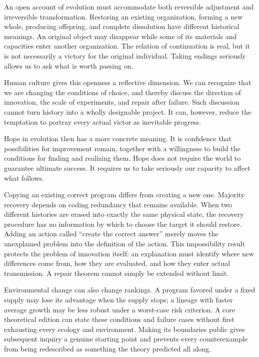 \documentclass[
  english,
  11pt,
  oneside]{book}
\begin{document}
An open account of evolution must accommodate both reversible adjustment and irreversible transformation. Restoring an existing organization, forming a new whole, producing offspring, and complete dissolution have different historical meanings. An original object may disappear while some of its materials and capacities enter another organization. The relation of continuation is real, but it is not necessarily a victory for the original individual. Taking endings seriously allows us to ask what is worth passing on.

Human culture gives this openness a reflective dimension. We can recognize that we are changing the conditions of choice, and thereby discuss the direction of innovation, the scale of experiments, and repair after failure. Such discussion cannot turn history into a wholly designable project. It can, however, reduce the temptation to portray every actual victor as inevitable progress.

Hope in evolution then has a more concrete meaning. It is confidence that possibilities for improvement remain, together with a willingness to build the conditions for finding and realizing them. Hope does not require the world to guarantee ultimate success. It requires us to take seriously our capacity to affect what follows.

Copying an existing correct program differs from creating a new one. Majority recovery depends on coding redundancy that remains available. When two different histories are erased into exactly the same physical state, the recovery procedure has no information by which to choose the target it should restore. Adding an action called ``create the correct answer'' merely moves the unexplained problem into the definition of the action. This impossibility result protects the problem of innovation itself: an explanation must identify where new differences come from, how they are evaluated, and how they enter actual transmission. A repair theorem cannot simply be extended without limit.

\begingroup{}

Environmental change can also change rankings. A program favored under a fixed supply may lose its advantage when the supply stops; a lineage with faster average growth may be less robust under a worst-case risk criterion. A core theoretical edition can state these conditions and failure cases without first exhausting every ecology and environment. Making its boundaries public gives subsequent inquiry a genuine starting point and prevents every counterexample from being redescribed as something the theory predicted all along.
\end{document}
